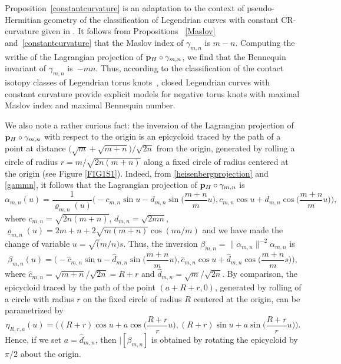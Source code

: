 \documentclass[pdftex]{sigma}
\def\gam{\gamma} %
\newcommand\bp{{\bf p}}
\newcommand\bph{{\bp_H}} %
\numberwithin{equation}{section}
\begin{document}
\begin{Remark}
Proposition~\ref{constantcurvature} is an adaptation to the context of pseudo-Hermitian geometry of the classification of Legendrian curves with constant CR-curvature given in \cite{MS}. It follows from Propositions ~\ref{Maslov} and~\ref{constantcurvature} that the Maslov index of $\gam_{m,n}$ is $m-n$.
Computing the writhe of the Lagrangian projection of $\bph \circ \gam_{m,n}$,
we find that the Bennequin invariant of $\gam_{m,n}$ is~$-mn$. Thus, according to the classification of the contact isotopy classes of Legendrian torus knots~\cite{EH}, closed Legendrian curves with constant curvature provide explicit models for negative torus knots with maximal Maslov index and maximal Bennequin number.
\end{Remark}

\begin{Remark}
We also note a rather curious fact: the inversion of the Lagrangian projection of $\bph\circ \gamma_{m,n}$ with respect to the origin is an epicycloid traced by the path of a point at distance $\bigl(\sqrt{m}+\sqrt{m+n}\bigr)/\sqrt{2n}$ from the origin, generated by rolling a circle of radius $r=m/\sqrt{2n(m+n)}$ along a fixed circle of radius  centered at the origin (see Figure \ref{FIG1S1}). Indeed, from \eqref{heisenbergprojection} and \eqref{gammn}, it follows that the Lagrangian projection of $\bph \circ \gam_{m,n}$ is
\[
\alpha_{m,n}(u)=\frac{1}{\varrho_{m,n}(u)}\biggl(-c_{m,n}\sin u-d_{m,n}\sin\biggl(\frac{m+n}{m}u\biggr),c_{m,n}\cos u+d_{m,n}\cos\biggl(\frac{m+n}{m}u\biggr)\biggr),
\]
where $c_{m,n}=\sqrt{2n(m+n)}$, $d_{m,n}=\sqrt{2m n}$, $\varrho_{m,n}(u)=2m+n+2\sqrt{m(m+n)}\cos(n u/m)$ and we have made the change of
variable $u=\sqrt(m/n)s$.
Thus, the inversion $\beta_{m,n}=\|\alpha_{m,n}\|^{-2}\alpha_{m,n}$ is
\[
\beta_{m,n}(u)=\biggl(-\hat{c}_{m,n}\sin u-\hat{d}_{m,n}\sin\biggl(\frac{m+n}{m}u\biggr),\hat{c}_{m,n}\cos u+\hat{d}_{m,n}\cos\biggl(\frac{m+n}{m}s\biggr)\biggr),
\]
where $\hat{c}_{m,n}=\sqrt{m+n}/\sqrt{2n}=R+r$ and $\hat{d}_{m,n}=\sqrt{m}/\sqrt{2n}$.
By comparison, the epicycloid traced by the path of the point $(a+R+r,0)$, generated by rolling of a circle with radius $r$ on the fixed circle of radius $R$ centered at the origin, can be parametrized by
\[
\eta_{R,r,a}(u)=\biggl((R+r)\cos u+a\cos\biggl(\frac{R+r}{r}u\biggr),(R+r)\sin u+a\sin\biggl(\frac{R+r}{r}u\biggr)\biggr).
\]
Hence, if we set $a=\hat{d}_{m,n}$, then $|[\beta_{m,n}]$ is obtained by rotating the epicycloid by $\pi/2$ about the origin.
\end{Remark}
\end{document}
